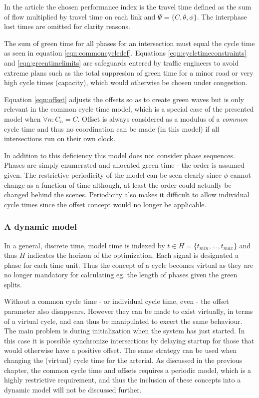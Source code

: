 In the article the chosen performance index is the travel time defined as the sum of flow multiplied by travel time on each link and $\Psi = \lbrace C,\theta,\phi \rbrace$. The interphase lost times are omitted for clarity reasons.

The sum of green time for all phases for an intersection must equal the cycle time as seen in equation \ref{eqn:commoncycledef}. Equations \ref{eqn:cycletimeconstraints} and \ref{eqn:greentimelimits} are safeguards entered by traffic engineers to avoid extreme plans such as the total suppresion of green time for a minor road or very high cycle times (capacity), which would otherwise be chosen under congestion.

Equation \ref{eqn:offset} adjusts the offsets so as to create green waves but is only relevant in the common cycle time model, which is a special case of the presented model when $\forall n : C_n = C$. Offset is always considered as a modulus of a \textit{common} cycle time and thus no coordination can be made (in this model) if all intersections run on their own clock.

In addition to this deficiency this model does not consider phase sequences. Phases are simply enumerated and allocated green time - the order is assumed given. The restrictive periodicity of the model can be seen clearly since $\phi$ cannot change as a function of time although, at least the order could actually be changed behind the scenes. Periodicity also makes it difficult to allow individual cycle times since the offset concept would no longer be applicable.

\subsubsection*{A dynamic model}
\label{dynamicmodel}
In a general, discrete time, model time is indexed by $t \in H = \lbrace t_{min},...,t_{max} \rbrace$ and thus $H$ indicates the horizon of the optimization. Each signal is designated a phase for each time unit. Thus the concept of a cycle becomes virtual as they are no longer mandatory for calculating eg. the length of phases given the green splits.

Without a common cycle time - or individual cycle time, even - the offset parameter also disappears. However they can be made to exist virtually, in terms of a virtual cycle, and can thus be manipulated to excert the same behaviour. 
The main problem is during initialization when the system has just started. In this case it is possible synchronize intersections by delaying startup for those that would otherwise have a positive offset. The same strategy can be used when changing the (virtual) cycle time for the arterial. As discussed in the previous chapter, the common cycle time and offsets requires a periodic model, which is a highly restrictive requirement, and thus the inclusion of these concepts into a dynamic model will not be discussed further.

